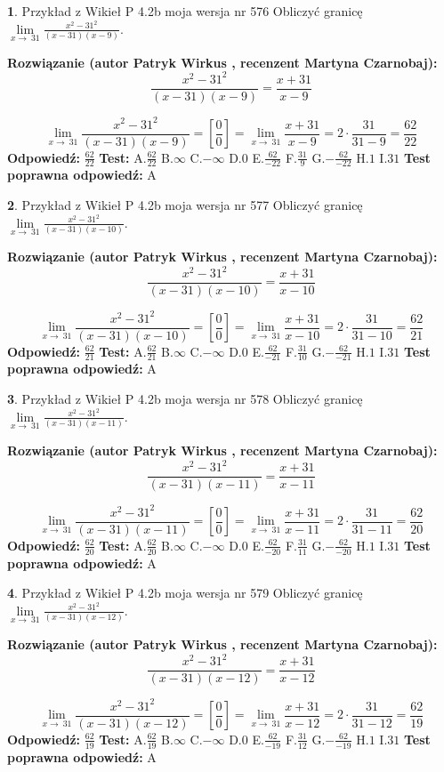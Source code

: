 \documentclass[12pt, a4paper]{article}
\theoremstyle{definition} %
\newtheorem{zad}{}
\newcommand{\zadStart}[1]{\begin{zad}#1\newline}
\newcommand{\zadStop}{\end{zad}}
\newcommand{\rozwStart}[2]{\noindent \textbf{Rozwiązanie (autor #1 , recenzent #2): }\newline}
\newcommand{\rozwStop}{\newline}
\newcommand{\odpStart}{\noindent \textbf{Odpowiedź:}\newline}
\newcommand{\odpStop}{\newline}
\newcommand{\testStart}{\noindent \textbf{Test:}\newline}
\newcommand{\testStop}{\newline}
\newcommand{\kluczStart}{\noindent \textbf{Test poprawna odpowiedź:}\newline}
\newcommand{\kluczStop}{\newline}
\begin{document}
\zadStart{Przykład z Wikieł P 4.2b moja wersja nr 576}
Obliczyć granicę $\lim\limits_{x\to\ 31}\frac{x^{2}-31^{2}}{(x-31)(x-9)}$.
\zadStop
\rozwStart{Patryk Wirkus}{Martyna Czarnobaj}
$$\frac{x^{2}-31^{2}}{(x-31)(x-9)}=\frac{x+31}{x-9}$$

$$\lim\limits_{x\to\ 31}\frac{x^{2}-31^{2}}{(x-31)(x-9)}=[\frac{0}{0}]=\lim\limits_{x\to\ 31}\frac{x+31}{x-9}=2 \cdot \frac{31}{31-9} = \frac{62}{22}$$
\rozwStop
\odpStart
$\frac{62}{22}$
\odpStop
\testStart
A.$\frac{62}{22}$
B.$\infty$
C.$-\infty$
D.$0$
E.$\frac{62}{-22}$
F.$\frac{31}{9}$
G.$-\frac{62}{-22}$
H.$1$
I.$31$
\testStop
\kluczStart
A
\kluczStop



\zadStart{Przykład z Wikieł P 4.2b moja wersja nr 577}
Obliczyć granicę $\lim\limits_{x\to\ 31}\frac{x^{2}-31^{2}}{(x-31)(x-10)}$.
\zadStop
\rozwStart{Patryk Wirkus}{Martyna Czarnobaj}
$$\frac{x^{2}-31^{2}}{(x-31)(x-10)}=\frac{x+31}{x-10}$$

$$\lim\limits_{x\to\ 31}\frac{x^{2}-31^{2}}{(x-31)(x-10)}=[\frac{0}{0}]=\lim\limits_{x\to\ 31}\frac{x+31}{x-10}=2 \cdot \frac{31}{31-10} = \frac{62}{21}$$
\rozwStop
\odpStart
$\frac{62}{21}$
\odpStop
\testStart
A.$\frac{62}{21}$
B.$\infty$
C.$-\infty$
D.$0$
E.$\frac{62}{-21}$
F.$\frac{31}{10}$
G.$-\frac{62}{-21}$
H.$1$
I.$31$
\testStop
\kluczStart
A
\kluczStop



\zadStart{Przykład z Wikieł P 4.2b moja wersja nr 578}
Obliczyć granicę $\lim\limits_{x\to\ 31}\frac{x^{2}-31^{2}}{(x-31)(x-11)}$.
\zadStop
\rozwStart{Patryk Wirkus}{Martyna Czarnobaj}
$$\frac{x^{2}-31^{2}}{(x-31)(x-11)}=\frac{x+31}{x-11}$$

$$\lim\limits_{x\to\ 31}\frac{x^{2}-31^{2}}{(x-31)(x-11)}=[\frac{0}{0}]=\lim\limits_{x\to\ 31}\frac{x+31}{x-11}=2 \cdot \frac{31}{31-11} = \frac{62}{20}$$
\rozwStop
\odpStart
$\frac{62}{20}$
\odpStop
\testStart
A.$\frac{62}{20}$
B.$\infty$
C.$-\infty$
D.$0$
E.$\frac{62}{-20}$
F.$\frac{31}{11}$
G.$-\frac{62}{-20}$
H.$1$
I.$31$
\testStop
\kluczStart
A
\kluczStop



\zadStart{Przykład z Wikieł P 4.2b moja wersja nr 579}
Obliczyć granicę $\lim\limits_{x\to\ 31}\frac{x^{2}-31^{2}}{(x-31)(x-12)}$.
\zadStop
\rozwStart{Patryk Wirkus}{Martyna Czarnobaj}
$$\frac{x^{2}-31^{2}}{(x-31)(x-12)}=\frac{x+31}{x-12}$$

$$\lim\limits_{x\to\ 31}\frac{x^{2}-31^{2}}{(x-31)(x-12)}=[\frac{0}{0}]=\lim\limits_{x\to\ 31}\frac{x+31}{x-12}=2 \cdot \frac{31}{31-12} = \frac{62}{19}$$
\rozwStop
\odpStart
$\frac{62}{19}$
\odpStop
\testStart
A.$\frac{62}{19}$
B.$\infty$
C.$-\infty$
D.$0$
E.$\frac{62}{-19}$
F.$\frac{31}{12}$
G.$-\frac{62}{-19}$
H.$1$
I.$31$
\testStop
\kluczStart
A
\kluczStop
\end{document}
